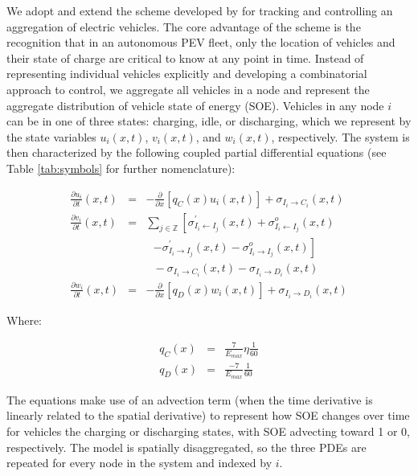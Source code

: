 \documentclass[journal]{IEEEtran}
\begin{document}
We adopt and extend the scheme developed by \cite{lefloch_pde_2016} for tracking and controlling an aggregation of electric vehicles. The core advantage of the scheme is the recognition that in an autonomous PEV fleet, only the location of vehicles and their state of charge are critical to know at any point in time. Instead of representing individual vehicles explicitly and developing a combinatorial approach to control, we aggregate all vehicles in a node and represent the aggregate distribution of vehicle state of energy (SOE). Vehicles in any node $i$ can be in one of three states: charging, idle, or discharging, which we represent by the state variables $u_i(x,t)$, $v_i(x,t)$, and $w_i(x,t)$, respectively. The system is then characterized by the following coupled partial differential equations (see Table \ref{tab:symbols} for further nomenclature):

\begin{eqnarray*}
    \frac{\partial u_i}{\partial t}(x,t) &=& -\frac{\partial}{\partial x}\left[ q_C(x) u_i(x,t) \right] + \sigma_{I_i \rightarrow C_i}(x,t) \\
    \frac{\partial v_i}{\partial t}(x,t) &=& \sum_{j\in\mathbb{Z}} \left[ \sigma_{I_i \leftarrow I_j}^\prime(x,t) + \sigma_{I_i \leftarrow I_j}^o(x,t) \right. \\
    & & ~~~ \left. - \sigma_{I_i \rightarrow I_j}^\prime(x,t) - \sigma_{I_i \rightarrow I_j}^o(x,t) \right] \\
    && ~~~ - \sigma_{I_i \rightarrow C_i}(x,t) - \sigma_{I_i \rightarrow D_i}(x,t) \\
    \frac{\partial w_i}{\partial t}(x,t) &=& -\frac{\partial}{\partial x}\left[ q_D(x) w_i(x,t) \right] + \sigma_{I_i \rightarrow D_i}(x,t) 
\end{eqnarray*}

Where: 

\begin{eqnarray*}
q_C(x) &=& \frac{7}{E_{max}}\eta\frac{1}{60} \\
q_D(x) &=& \frac{-7}{E_{max}}\frac{1}{60}
\end{eqnarray*}

The equations make use of an advection term (when the time derivative is linearly related to the spatial derivative) to represent how SOE changes over time for vehicles the charging or discharging states, with SOE advecting toward 1 or 0, respectively. The model is spatially disaggregated, so the three PDEs are repeated for every node in the system and indexed by $i$.
\end{document}
